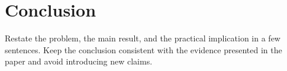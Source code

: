 \section{Conclusion}
\label{sec:conclusion}

Restate the problem, the main result, and the practical implication in a few
sentences. Keep the conclusion consistent with the evidence presented in the
paper and avoid introducing new claims.
